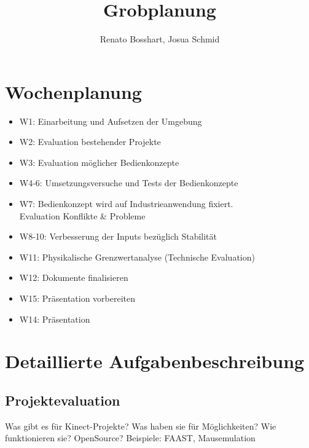 \documentclass[11pt]{article} %
\title{Grobplanung}
\author{Renato Bosshart, Josua Schmid}
\begin{document}
\maketitle

\section{Wochenplanung}

\begin{itemize}
\setlength{\itemsep}{-10pt}
	\item W1: \tabto{15mm} Einarbeitung und Aufsetzen der Umgebung \\
	\item W2: \tabto{15mm} Evaluation bestehender Projekte \\
	\item W3: \tabto{15mm} Evaluation möglicher Bedienkonzepte \\
	\item W4-6: \tabto{15mm} Umsetzungsversuche und Tests der Bedienkonzepte \\
	\item W7: \tabto{15mm} Bedienkonzept wird auf Industrieanwendung fixiert.
			\\\tabto{15mm} Evaluation Konflikte \& Probleme \\
	\item W8-10: \tabto{15mm} Verbesserung der Inputs bezüglich Stabilität \\
	\item W11: \tabto{15mm} Physikalische Grenzwertanalyse (Technische Evaluation) \\
	\item W12: \tabto{15mm} Dokumente finalisieren \\
	\item W15: \tabto{15mm} Präsentation vorbereiten \\
	\item W14: \tabto{15mm} Präsentation
\end{itemize}

\section{Detaillierte Aufgabenbeschreibung}
\subsection{Projektevaluation}
Was gibt es für Kinect-Projekte? Was haben sie für Möglichkeiten? Wie funktionieren sie? OpenSource? Beispiele: FAAST, Mausemulation
\end{document}
